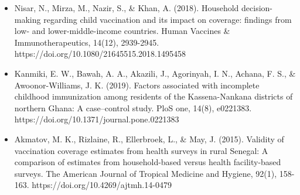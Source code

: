 \documentclass[12pt]{article}
\begin{document}
\begin{itemize}
    \item Nisar, N., Mirza, M., Nazir, S., \& Khan, A. (2018). Household decision-making regarding child vaccination and its impact on coverage: findings from low- and lower-middle-income countries. Human Vaccines \& Immunotherapeutics, 14(12), 2939-2945. https://doi.org/10.1080/21645515.2018.1495458
    \item Kanmiki, E. W., Bawah, A. A., Akazili, J., Agorinyah, I. N., Achana, F. S., \& Awoonor-Williams, J. K. (2019). Factors associated with incomplete childhood immunization among residents of the Kassena-Nankana districts of northern Ghana: A case–control study. PloS one, 14(8), e0221383. https://doi.org/10.1371/journal.pone.0221383
    \item Akmatov, M. K., Rizlaine, R., Ellerbroek, L., \& May, J. (2015). Validity of vaccination coverage estimates from health surveys in rural Senegal: A comparison of estimates from household-based versus health facility-based surveys. The American Journal of Tropical Medicine and Hygiene, 92(1), 158-163. https://doi.org/10.4269/ajtmh.14-0479

\end{itemize}
\end{document}
